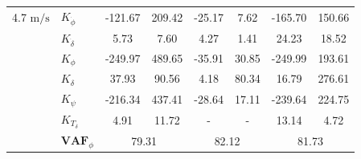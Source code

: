 \begin{table}[]
\begin{tabular}{llcccccc}
    4.7 $\si{\meter\per\second}$ & $K_{\dot{\phi}} $     & -121.67                                    & 209.42                                             & -25.17                                     & 7.62                                               & -165.70                                    & 150.66                                             \\
                                    & $K_{\dot{\delta}}$    & 5.73                                       & 7.60                                               & 4.27                                       & 1.41                                               & 24.23                                      & 18.52                                              \\
                                    & $K_{\phi} $           & -249.97                                    & 489.65                                             & -35.91                                     & 30.85                                              & -249.99                                    & 193.61                                             \\
                                    & $K_\delta $           & 37.93                                      & 90.56                                              & 4.18                                       & 80.34                                              & 16.79                                      & 276.61                                             \\
                                    & $K_\psi $             & -216.34                                    & 437.41                                             & -28.64                                     & 17.11                                              & -239.64                                    & 224.75                                             \\
                                    & $K_{T_\delta}$        & 4.91                                       & 11.72                                              & -                                          & -                                                  & 13.14                                      & 4.72                                               \\ \cline{2-8} 
                                    & $\mathbf{VAF}_\phi$   & \multicolumn{2}{c}{79.31}                                                                       & \multicolumn{2}{c}{82.12}                                                                       & \multicolumn{2}{c}{81.73}                                                                       \\

\end{tabular}
\end{table}
